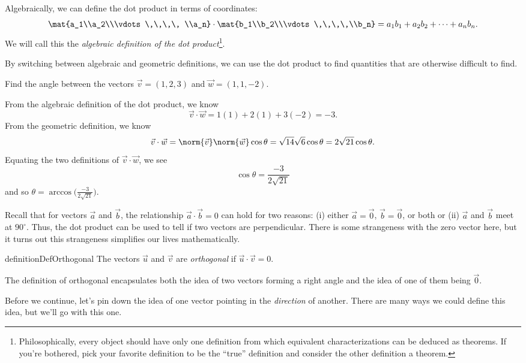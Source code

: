 Algebraically, we can define the dot product in terms of coordinates:
\[
	\mat{a_1\\a_2\\\vdots\,\,\,\, \\a_n}\cdot \mat{b_1\\b_2\\\vdots\,\,\,\,\\b_n}
	=a_1b_1+a_2b_2+\cdots+a_nb_n.
\]
We will call this the \emph{algebraic definition of the dot product}\footnote{
	Philosophically,
every object should have only one definition from which equivalent characterizations
can be deduced as theorems.  If you're bothered, pick your favorite definition
to be the ``true'' definition and consider the other definition a theorem.
}.

By switching between algebraic and geometric definitions, we can use the dot
product to find quantities that are otherwise difficult to find.
\begin{example}
	Find the angle between the vectors $\vec v=(1,2,3)$ and $\vec w=(1,1,-2)$.

	From the algebraic definition of the dot product, we know
	\[
		\vec v\cdot \vec w = 1(1)+2(1)+3(-2) = -3.
	\]
	From the geometric definition, we know
	\[
		\vec v\cdot \vec w=\norm{\vec v}\norm{\vec w}\cos\theta
		=\sqrt{14}\sqrt{6}\cos\theta=2\sqrt{21}\cos\theta.
	\]
	Equating the two definitions of $\vec v\cdot \vec w$, we see
	\[
		\cos\theta = \frac{-3}{2\sqrt{21}}
	\]
	and so $\theta=\arccos\Big(\tfrac{-3}{2\sqrt{21}}\Big)$.
\end{example}

Recall that for vectors $\vec a$ and $\vec b$, the relationship $\vec a\cdot \vec b=0$
can hold for two reasons: (i) either $\vec a=\vec 0$, $\vec b=\vec 0$, or both
or (ii) $\vec a$ and $\vec b$ meet at $90^{\circ}$.  Thus, the dot product
can be used to tell if two vectors are perpendicular.  There is some strangeness
with the zero vector here, but it turns out this strangeness simplifies our lives
mathematically.

\begin{restatable}[Orthogonal]{definition}{DefOrthogonal}
	The vectors $\vec u$ and $\vec v$ are \emph{orthogonal}
	if $\vec u\cdot\vec v=0$.
\end{restatable}

The definition of orthogonal encapsulates both the idea of two vectors forming
a right angle and the idea of one of them being $\vec 0$.

Before we continue, let's pin down the idea of one vector pointing
in the \emph{direction} of another.  
There are many ways we could define
this idea, but we'll go with this one.

